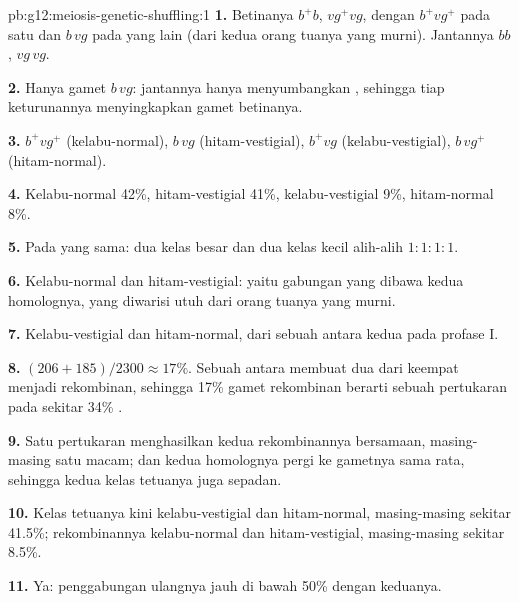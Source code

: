 \begin{solution}{pb:g12:meiosis-genetic-shuffling:1}
\textbf{1.} Betinanya $b^+b$, $vg^+vg$, dengan $b^+vg^+$ pada satu
 dan $b\,vg$ pada  yang lain (dari kedua orang tuanya
yang murni). Jantannya $bb$, $vg\,vg$.

\textbf{2.} Hanya gamet $b\,vg$: jantannya hanya menyumbangkan 
, sehingga  tiap keturunannya menyingkapkan gamet betinanya.

\textbf{3.} $b^+vg^+$ (kelabu-normal), $b\,vg$ (hitam-vestigial),
$b^+vg$ (kelabu-vestigial), $b\,vg^+$ (hitam-normal).

\textbf{4.} Kelabu-normal 42\%, hitam-vestigial 41\%, kelabu-vestigial
9\%, hitam-normal 8\%.

\textbf{5.} Pada  yang sama: dua kelas besar dan dua kelas
kecil alih-alih $1:1:1:1$.

\textbf{6.} Kelabu-normal dan hitam-vestigial: yaitu gabungan yang
dibawa kedua homolognya, yang diwarisi utuh dari orang tuanya yang murni.

\textbf{7.} Kelabu-vestigial dan hitam-normal, dari sebuah  antara kedua  pada profase I.

\textbf{8.} $(206 + 185)/2300 \approx 17\%$. Sebuah 
antara  membuat dua dari keempat  menjadi rekombinan,
sehingga 17\% gamet rekombinan berarti sebuah pertukaran pada sekitar
34\% .

\textbf{9.} Satu pertukaran menghasilkan kedua  rekombinannya
bersamaan, masing-masing satu macam; dan kedua homolognya pergi ke
gametnya sama rata, sehingga kedua kelas tetuanya juga sepadan.

\textbf{10.} Kelas tetuanya kini kelabu-vestigial dan hitam-normal,
masing-masing sekitar 41.5\%; rekombinannya kelabu-normal dan
hitam-vestigial, masing-masing sekitar 8.5\%.

\textbf{11.} Ya: penggabungan ulangnya jauh di bawah 50\% dengan keduanya.


\end{solution}
